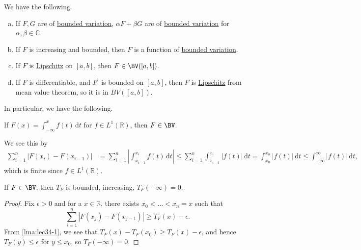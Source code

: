 \begin{remark}
	We have the following.
	\begin{enumerate}[(a)]
		\item If \(F,G\) are of \hyperref[def:bounded-variation]{bounded variation}, \(\alpha F + \beta G\) are of \hyperref[def:bounded-variation]{bounded variation}
		      for \(\alpha , \beta \in \mathbb{C} \).
		\item If \(F\) is increasing and bounded, then \(F\) is a function of \hyperref[def:bounded-variation]{bounded variation}.
		\item If \(F\) is \hyperref[def:Lipschitz]{Lipschitz} on \([a,b]\), then \(F \in\BV([a,b])\).
		\item If \(F\) is differentiable, and \(F^\prime\) is bounded on \([a,b]\), then \(F\) is \hyperref[def:Lipschitz]{Lipschitz} from mean value theorem,
		      so it is in \(BV([a,b])\).
	\end{enumerate}
\end{remark}

In particular, we have the following.
\begin{remark}
	If \(F(x) = \int_{-\infty}^x f(t) \,\mathrm{d} t\) for \(f \in L^1(\mathbb{R})\), then \(F \in\BV\).
\end{remark}
\begin{explanation}
	We see this by
	\[
		\begin{split}
			\sum_{i=1}^n \left\vert F(x_i) - F(x_{i-1}) \right\vert & = \sum_{i=1}^n \left\vert \int_{x_{i-1}}^{x_i} f(t) \,\mathrm{d} t \right\vert
			\leq \sum_{i=1}^n \int_{x_{i-1}}^{x_i} \left\vert f(t) \right\vert \,\mathrm{d} t
			= \int_{x_0}^{x_n} \left\vert f(t) \right\vert \,\mathrm{d} t
			\leq \int_{-\infty}^\infty \left\vert f(t) \right\vert \,\mathrm{d} t,
		\end{split}
	\]
	which is finite since \(f\in L^1(\mathbb{R} )\).
\end{explanation}

\begin{lemma}\label{lma:lec34-2}
	If \(F \in\BV\), then \(T_F\) is bounded, increasing, \(T_F(-\infty) = 0\).
\end{lemma}
\begin{proof}
	Fix \(\epsilon > 0\) and for a \(x\in \mathbb{R} \), there exists \(x_0 < \dots < x_n = x \) such that
	\[
		\sum_{i=1}^{n} \left\vert F(x_{j} ) - F(x_{j-1})\right\vert \geq T_{F} (x) - \epsilon.
	\]
	From \autoref{lma:lec34-1}, we see that \(T_{F} (x) - T_{F} (x_0) \geq T_{F} (x) - \epsilon \), and hence
	\(T_{F} (y) \leq \epsilon \) for \(y\leq x_0\), so \(T_{F} (-\infty ) = 0\).
\end{proof}

